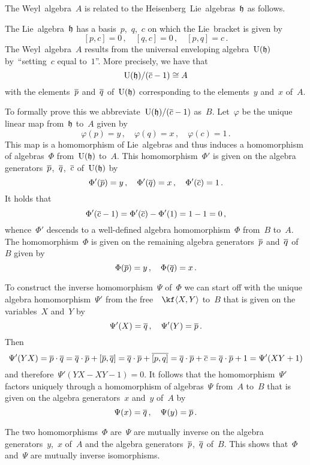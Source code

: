 \begin{remark}
	The Weyl~algebra~$A$ is related to the {\threedimensional} Heisenberg~Lie~algebras~$\mathfrak{h}$ as follows.

	The Lie~algebra~$\mathfrak{h}$ has a basis~$p$,~$q$,~$c$ on which the Lie~bracket is given by
	\[
		[p,c] = 0 \,,
		\quad
		[q,c] = 0 \,,
		\quad
		[p,q] = c \,.
	\]
	The Weyl~algebra~$A$ results from the universal enveloping algebra~$\operatorname{U}(\mathfrak{h})$ by~\enquote{setting~$c$ equal to~$1$}.
	More precisely, we have that
	\[
		\operatorname{U}(\mathfrak{h}) / \lparen \overline{c} - 1 \rparen
		\cong
		A
	\]
	with the elements~$\overline{p}$ and~$\overline{q}$ of~$\operatorname{U}(\mathfrak{h})$ corresponding to the elements~$y$ and~$x$ of~$A$.

	To formally prove this we abbreviate~$\operatorname{U}(\mathfrak{h})/(\overline{c} - 1)$ as~$B$.	
	Let~$\varphi$ be the unique linear map from~$\mathfrak{h}$ to~$A$ given by
	\[
		\varphi(p) = y \,,
		\quad
		\varphi(q) = x \,,
		\quad
		\varphi(c)  =1 \,.
	\]
	This map is a homomorphism of Lie~algebras and thus induces a homomorphism of algebras~$\Phi$ from~$\operatorname{U}(\mathfrak{h})$ to~$A$.
	This homomorphism~$\Phi'$ is given on the algebra generators~$\overline{p}$,~$\overline{q}$,~$\overline{c}$ of~$\operatorname{U}(\mathfrak{h})$ by
	\[
		\Phi'( \overline{p} ) = y \,,
		\quad
		\Phi'( \overline{q} ) = x \,,
		\quad
		\Phi'( \overline{c} ) = 1 \,.
	\]
	It holds that
	\[
		\Phi'(\overline{c} - 1)
		=
		\Phi'(\overline{c}) - \Phi'(1)
		=
		1 - 1
		=
		0 \,,
	\]
	whence~$\Phi'$ descends to a well-defined algebra homomorphism~$\Phi$ from~$B$ to~$A$.
	The homomorphism~$\Phi$ is given on the remaining algebra generators~$\overline{p}$ and~$\overline{q}$ of~$B$ given by
	\[
		\Phi(\overline{p}) = y \,,
		\quad
		\Phi(\overline{q}) = x \,.
	\]
	
	To construct the inverse homomorphism~$\Psi$ of~$\Phi$ we can start off with the unique algebra homomorphism~$\Psi'$ from the free~\algebra{$\kf$}~$\kf\gen{X,Y}$ to~$B$ that is given on the variables~$X$ and~$Y$ by
	\[
		\Psi'(X) = \overline{q} \,,
		\quad
		\Psi'(Y) = \overline{p} \,.
	\]
	Then
	\[
		\Psi'(YX)
		=
		\overline{p} \cdot \overline{q}
		=
		\overline{q} \cdot \overline{p}
		+
		[ \overline{p}, \overline{q} ]
		=
		\overline{q} \cdot \overline{p} + \overline{[p,q]}
		=
		\overline{q} \cdot \overline{p} + \overline{c}
		=
		\overline{q} \cdot \overline{p} + 1
		=
		\Psi'(XY + 1)
	\]
	and therefore~$\Psi'(YX - XY - 1) = 0$.
	It follows that the homomorphism~$\Psi'$ factors uniquely through a homomorphism of algebras~$\Psi$ from~$A$ to~$B$ that is given on the algebra generators~$x$ and~$y$ of~$A$ by
	\[
		\Psi(x) = \overline{q} \,,
		\quad
		\Psi(y) = \overline{p} \,.
	\]
	
	The two homomorphisms~$\Phi$ are~$\Psi$ are mutually inverse on the algebra generators~$y$,~$x$ of~$A$ and the algebra generators~$\overline{p}$,~$\overline{q}$ of~$B$.
	This shows that~$\Phi$ and~$\Psi$ are mutually inverse isomorphisms.
\end{remark}


